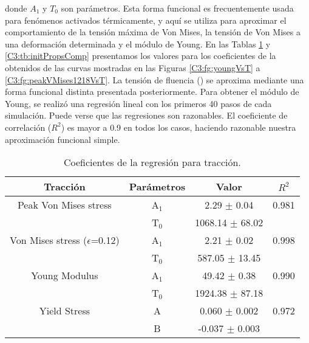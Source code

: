 donde $A_{1}$ y $T_{0}$ son parámetros. Esta forma funcional es frecuentemente usada para fenómenos activados térmicamente, y aquí se utiliza para aproximar el comportamiento de la tensión máxima de Von Mises, la tensión de Von Mises a una deformación determinada y el módulo de Young. En las Tablas \ref{C3:tb:initPropsTen} y \ref{C3:tb:initPropsComp} presentamos los valores para los coeficientes de la  obtenidos de las curvas mostradas en las Figuras \ref{C3:fg:youngVsT} a \ref{C3:fg:peakVMises1218VsT}. La tensión de fluencia () se aproxima mediante una forma funcional distinta presentada posteriormente. Para obtener el módulo de Young, se realizó una regresión lineal con los primeros 40 pasos de cada simulación. Puede verse que las regresiones son razonables. El coeficiente de correlación ($R^2$) es mayor a 0.9 en todos los casos, haciendo razonable nuestra aproximación funcional simple.
	

\begin{table}[htp]
\begin{center}
\begin{tabular}{*{4}{c}}
\hline
\textbf{Tracción} & Parámetros & Valor & $R^{2}$ \\ \hline \hline
Peak Von Mises stress & A$_{1}$ & 2.29 $\pm$ 0.04 & 0.981 \\
 & T$_{0}$ & 1068.14 $\pm$ 68.02 & \\ \hline
Von Mises stress ($\epsilon$=0.12) & A$_{1}$ & 2.21 $\pm$ 0.02 & 0.998 \\
 & T$_{0}$ & 587.05 $\pm$ 13.45 & \\ \hline
Young Modulus & A$_{1}$ & 49.42 $\pm$ 0.38 & 0.990 \\
 & T$_{0}$ & 1924.38 $\pm$ 87.18 & \\ \hline
Yield Stress & A & 0.060 $\pm$ 0.002 & 0.972 \\
 & B & -0.037 $\pm$ 0.003 & \\ \hline
\end{tabular}
\end{center}
\caption[Coeficientes de la regresión para tracción]{Coeficientes de la regresión para tracción.}
\label{C3:tb:initPropsTen}
\end{table}

